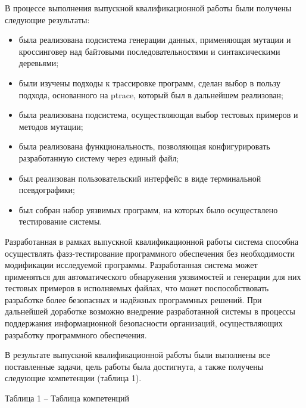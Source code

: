 \label{sec:conclusion}

В процессе выполнения выпускной квалификационной работы были получены следующие результаты:

\begin{itemize}
	\item была реализована подсистема генерации данных, применяющая мутации и кроссинговер над байтовыми последовательностями и синтаксическими деревьями;
	
	\item были изучены подходы к трассировке программ, сделан выбор в пользу подхода, основанного на ptrace, который был в дальнейшем реализован;
	
	\item была реализована подсистема, осуществляющая выбор тестовых примеров и методов мутации;
	
	\item была реализована функциональность, позволяющая конфигурировать разработанную систему через единый файл;
	
	\item был реализован пользовательский интерфейс в виде терминальной псевдографики;
	
	\item был собран набор уязвимых программ, на которых было осуществлено тестирование системы.
\end{itemize}

Разработанная в рамках выпускной квалификационной работы система способна осуществлять фазз-тестирование программного обеспечения без необходимости модификации исследуемой программы. Разработанная система  может применяться для автоматического обнаружения уязвимостей и генерации для них тестовых примеров в исполняемых файлах, что может поспособствовать разработке более безопасных и надёжных программных решений. При дальнейшей доработке возможно внедрение разработанной системы в процессы поддержания информационной безопасности организаций, осуществляющих разработку программного обеспечения.

В результате выпускной квалификационной работы были выполнены
все поставленные задачи, цель работы была достигнута, а также получены
следующие компетенции (таблица 1).

\noindent Таблица 1 -- Таблица компетенций
\vspace{5pt}

